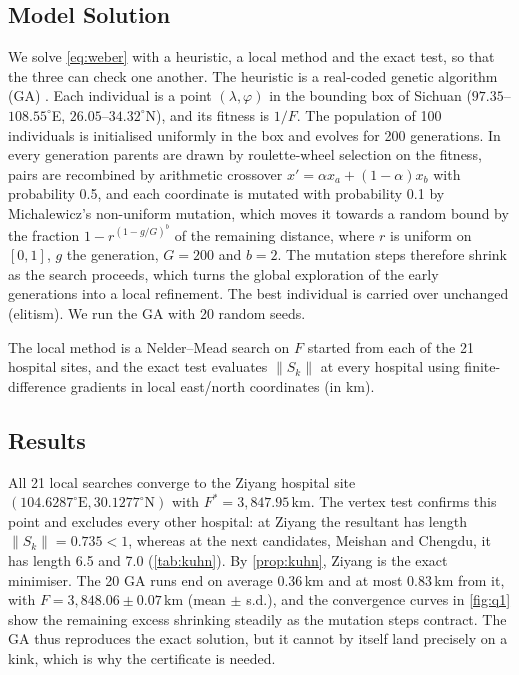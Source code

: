 \documentclass[11pt,a4paper]{article}
\theoremstyle{definition}
\begin{document}
\subsection{Model Solution}
We solve \eqref{eq:weber} with a heuristic, a local method and the exact test, so that the three can check one another.
The heuristic is a real-coded genetic algorithm (GA) \citep{michalewicz1996}.
Each individual is a point $(\lambda,\varphi)$ in the bounding box of Sichuan ($97.35$--$108.55^\circ$E, $26.05$--$34.32^\circ$N), and its fitness is $1/F$.
The population of 100 individuals is initialised uniformly in the box and evolves for 200 generations.
In every generation parents are drawn by roulette-wheel selection on the fitness, pairs are recombined by arithmetic crossover $x'=\alpha x_a+(1-\alpha)x_b$ with probability 0.5, and each coordinate is mutated with probability 0.1 by Michalewicz's non-uniform mutation, which moves it towards a random bound by the fraction $1-r^{(1-g/G)^b}$ of the remaining distance, where $r$ is uniform on $[0,1]$, $g$ the generation, $G=200$ and $b=2$.
The mutation steps therefore shrink as the search proceeds, which turns the global exploration of the early generations into a local refinement.
The best individual is carried over unchanged (elitism).
We run the GA with 20 random seeds.

The local method is a Nelder--Mead search on $F$ started from each of the 21 hospital sites, and the exact test evaluates $\|S_k\|$ at every hospital using finite-difference gradients in local east/north coordinates (in km).

\subsection{Results}\label{sec:q1-results}
All 21 local searches converge to the Ziyang hospital site $(104.6287^\circ\text{E}, 30.1277^\circ\text{N})$ with $F^*=3{,}847.95$\,km.
The vertex test confirms this point and excludes every other hospital: at Ziyang the resultant has length $\|S_k\|=0.735<1$, whereas at the next candidates, Meishan and Chengdu, it has length 6.5 and 7.0 (\cref{tab:kuhn}).
By \cref{prop:kuhn}, Ziyang is the exact minimiser.
The 20 GA runs end on average 0.36\,km and at most 0.83\,km from it, with $F=3{,}848.06\pm0.07$\,km (mean $\pm$ s.d.), and the convergence curves in \cref{fig:q1} show the remaining excess shrinking steadily as the mutation steps contract.
The GA thus reproduces the exact solution, but it cannot by itself land precisely on a kink, which is why the certificate is needed.
\end{document}
